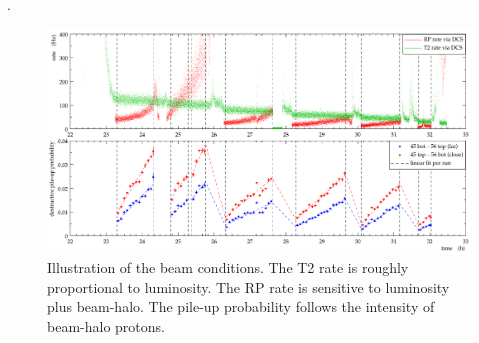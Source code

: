 .


\begin{figure}
\begin{center}
\includegraphics[width=16cm]{fig/overview.pdf}
\vskip-3mm
\caption{Illustration of the beam conditions. The T2 rate is roughly proportional to luminosity. The RP rate is sensitive to luminosity plus beam-halo. The pile-up probability follows the intensity of beam-halo protons. }
\label{fig:overview}
\end{center}
\end{figure}
